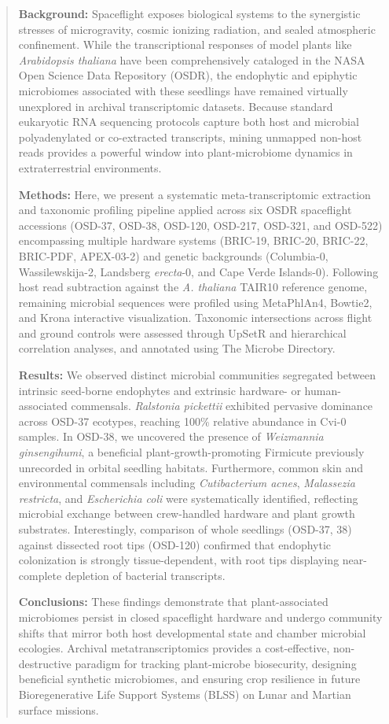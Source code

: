 \begin{abstract}
\textbf{Background:} Spaceflight exposes biological systems to the synergistic stresses of microgravity, cosmic ionizing radiation, and sealed atmospheric confinement. While the transcriptional responses of model plants like \textit{Arabidopsis thaliana} have been comprehensively cataloged in the NASA Open Science Data Repository (OSDR), the endophytic and epiphytic microbiomes associated with these seedlings have remained virtually unexplored in archival transcriptomic datasets. Because standard eukaryotic RNA sequencing protocols capture both host and microbial polyadenylated or co-extracted transcripts, mining unmapped non-host reads provides a powerful window into plant-microbiome dynamics in extraterrestrial environments.

\textbf{Methods:} Here, we present a systematic meta-transcriptomic extraction and taxonomic profiling pipeline applied across six OSDR spaceflight accessions (OSD-37, OSD-38, OSD-120, OSD-217, OSD-321, and OSD-522) encompassing multiple hardware systems (BRIC-19, BRIC-20, BRIC-22, BRIC-PDF, APEX-03-2) and genetic backgrounds (Columbia-0, Wassilewskija-2, Landsberg \textit{erecta}-0, and Cape Verde Islands-0). Following host read subtraction against the \textit{A. thaliana} TAIR10 reference genome, remaining microbial sequences were profiled using MetaPhlAn4, Bowtie2, and Krona interactive visualization. Taxonomic intersections across flight and ground controls were assessed through UpSetR and hierarchical correlation analyses, and annotated using The Microbe Directory.

\textbf{Results:} We observed distinct microbial communities segregated between intrinsic seed-borne endophytes and extrinsic hardware- or human-associated commensals. \textit{Ralstonia pickettii} exhibited pervasive dominance across OSD-37 ecotypes, reaching 100\% relative abundance in Cvi-0 samples. In OSD-38, we uncovered the presence of \textit{Weizmannia ginsengihumi}, a beneficial plant-growth-promoting Firmicute previously unrecorded in orbital seedling habitats. Furthermore, common skin and environmental commensals including \textit{Cutibacterium acnes}, \textit{Malassezia restricta}, and \textit{Escherichia coli} were systematically identified, reflecting microbial exchange between crew-handled hardware and plant growth substrates. Interestingly, comparison of whole seedlings (OSD-37, 38) against dissected root tips (OSD-120) confirmed that endophytic colonization is strongly tissue-dependent, with root tips displaying near-complete depletion of bacterial transcripts.

\textbf{Conclusions:} These findings demonstrate that plant-associated microbiomes persist in closed spaceflight hardware and undergo community shifts that mirror both host developmental state and chamber microbial ecologies. Archival metatranscriptomics provides a cost-effective, non-destructive paradigm for tracking plant-microbe biosecurity, designing beneficial synthetic microbiomes, and ensuring crop resilience in future Bioregenerative Life Support Systems (BLSS) on Lunar and Martian surface missions.
\end{abstract}
